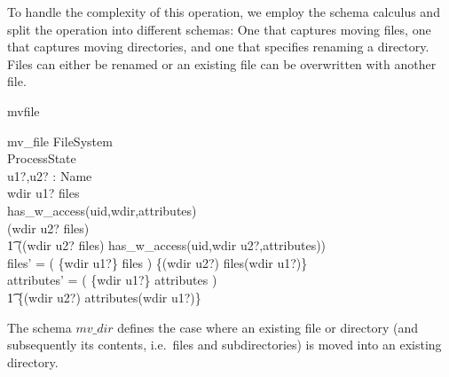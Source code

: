 To handle the complexity of this operation, we employ the schema calculus and
split the operation into different schemas: One that captures moving files, one
that captures moving directories, and one that specifies renaming a directory.
Files can either be renamed or an existing file can be overwritten with another
file.
\enlargethispage{2.5\baselineskip}
\begin{doc}{mvfile}
 \begin{schema}{mv\_file}
    \Delta FileSystem \\
    \Xi ProcessState \\
    u1?,u2? : Name \\
    \where
    wdir \cat \langle u1? \rangle \isfilein files \\
    has\_w\_access(uid,wdir,attributes) \\                                      

    \lnot (wdir \cat \langle u2? \rangle \isin files) \\
    \t1 \lor ((wdir \cat \langle u2? \rangle \isfilein files)
    \land has\_w\_access(uid,wdir \cat \langle u2?\rangle,attributes)) \\
    
    files' = ( \{wdir \cat \langle u1?\rangle\} \ndres files ) \oplus \{(wdir
    \cat \langle u2?\rangle) \mapsto files(wdir \cat \langle u1?\rangle)\} \\
    
    attributes' = ( \{wdir \cat \langle u1?\rangle\} \ndres attributes ) \oplus \\
    \t1 \{(wdir \cat \langle u2?\rangle) \mapsto attributes(wdir \cat \langle
    u1?\rangle)\} \\ 
  \end{schema}
\end{doc}
The schema $mv\_dir$ defines the case where an existing file or directory (and
subsequently its contents, i.e.\  files and subdirectories) is moved into an
existing directory.
